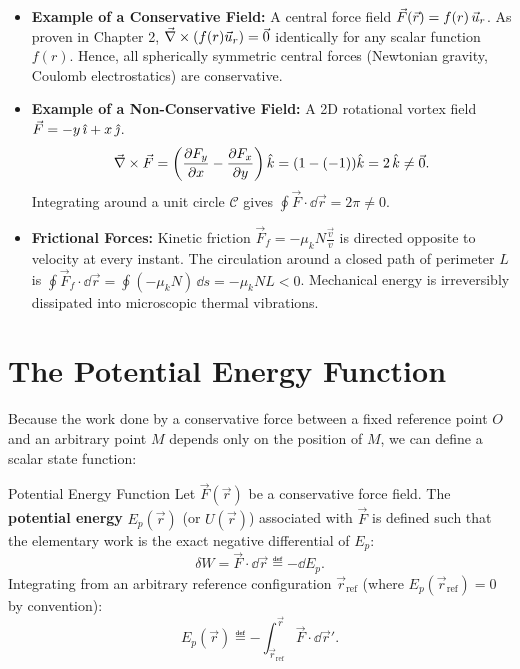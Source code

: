 \begin{itemize}[leftmargin=1.5em,itemsep=4pt]
  \item \textbf{Example of a Conservative Field:} A central force field $\vec{F}(\vec{r}) = f(r)\,\vec{u}_r$. As proven in Chapter 2, $\vec{\nabla}\times(f(r)\vec{u}_r) = \vec{0}$ identically for any scalar function $f(r)$. Hence, all spherically symmetric central forces (Newtonian gravity, Coulomb electrostatics) are conservative.
  \item \textbf{Example of a Non-Conservative Field:} A 2D rotational vortex field $\vec{F} = -y\,\hat{\imath} + x\,\hat{\jmath}$.
  \[
  \vec{\nabla}\times\vec{F} = \left(\frac{\partial F_y}{\partial x} - \frac{\partial F_x}{\partial y}\right)\hat{k} = (1 - (-1))\hat{k} = 2\,\hat{k} \neq \vec{0}.
  \]
  Integrating around a unit circle $\mathcal{C}$ gives $\oint \vec{F}\cdot\dd\vec{r} = 2\pi \neq 0$.
  \item \textbf{Frictional Forces:} Kinetic friction $\vec{F}_f = -\mu_k N \frac{\vec{v}}{v}$ is directed opposite to velocity at every instant. The circulation around a closed path of perimeter $L$ is $\oint \vec{F}_f\cdot\dd\vec{r} = \oint (-\mu_k N)\,\dd s = -\mu_k N L < 0$. Mechanical energy is irreversibly dissipated into microscopic thermal vibrations.
\end{itemize}

\section{The Potential Energy Function}

Because the work done by a conservative force between a fixed reference point $O$ and an arbitrary point $M$ depends only on the position of $M$, we can define a scalar state function:

\begin{definitionbox}{Potential Energy Function}
Let $\vec{F}(\vec{r})$ be a conservative force field. The \textbf{potential energy} $E_p(\vec{r})$ (or $U(\vec{r})$) associated with $\vec{F}$ is defined such that the elementary work is the exact negative differential of $E_p$:
\begin{equation}
\delta W = \vec{F} \cdot \dd\vec{r} \eqdef -\dd E_p.
\end{equation}
Integrating from an arbitrary reference configuration $\vec{r}_{\text{ref}}$ (where $E_p(\vec{r}_{\text{ref}}) = 0$ by convention):
\begin{equation}
E_p(\vec{r}) \eqdef -\int_{\vec{r}_{\text{ref}}}^{\vec{r}} \vec{F} \cdot \dd\vec{r}'.
\end{equation}
\end{definitionbox}

